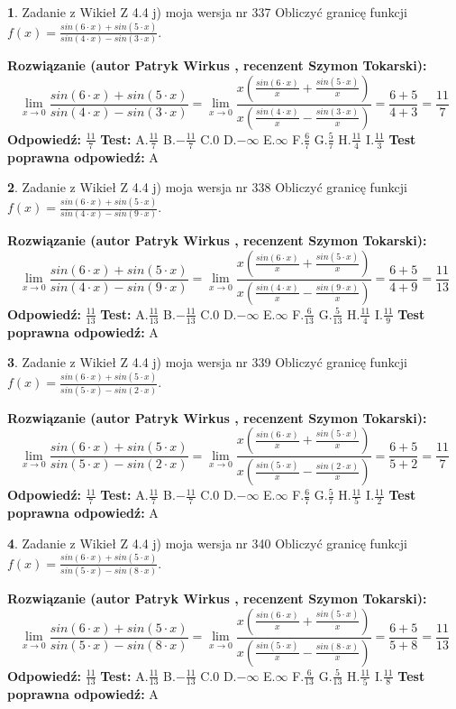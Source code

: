 \documentclass[12pt, a4paper]{article}
\theoremstyle{definition} %
\newtheorem{zad}{}
\newcommand{\zadStart}[1]{\begin{zad}#1\newline}
\newcommand{\zadStop}{\end{zad}}
\newcommand{\rozwStart}[2]{\noindent \textbf{Rozwiązanie (autor #1 , recenzent #2): }\newline}
\newcommand{\rozwStop}{\newline}
\newcommand{\odpStart}{\noindent \textbf{Odpowiedź:}\newline}
\newcommand{\odpStop}{\newline}
\newcommand{\testStart}{\noindent \textbf{Test:}\newline}
\newcommand{\testStop}{\newline}
\newcommand{\kluczStart}{\noindent \textbf{Test poprawna odpowiedź:}\newline}
\newcommand{\kluczStop}{\newline}
\begin{document}
\zadStart{Zadanie z Wikieł Z 4.4 j) moja wersja nr 337}
Obliczyć granicę funkcji $f(x)=\frac{sin(6\cdot x) +sin(5\cdot x)}{sin(4\cdot x) -sin(3\cdot x)}$.
\zadStop
\rozwStart{Patryk Wirkus}{Szymon Tokarski}
$$\lim\limits_{x\to 0}\frac{sin(6\cdot x) +sin(5\cdot x)}{sin(4\cdot x) -sin(3\cdot x)}=\lim\limits_{x\to 0}\frac{x(\frac{sin(6\cdot x)}{x}+\frac{sin(5\cdot x)}{x})}{x(\frac{sin(4\cdot x)}{x}-\frac{sin(3\cdot x)}{x})}=\frac{6+5}{4+3} = \frac{11}{7}$$
\rozwStop
\odpStart
$\frac{11}{7}$
\odpStop
\testStart
A.$\frac{11}{7}$
B.$-\frac{11}{7}$
C.$0$
D.$-\infty$
E.$\infty$
F.$\frac{6}{7}$
G.$\frac{5}{7}$
H.$\frac{11}{4}$
I.$\frac{11}{3}$
\testStop
\kluczStart
A
\kluczStop



\zadStart{Zadanie z Wikieł Z 4.4 j) moja wersja nr 338}
Obliczyć granicę funkcji $f(x)=\frac{sin(6\cdot x) +sin(5\cdot x)}{sin(4\cdot x) -sin(9\cdot x)}$.
\zadStop
\rozwStart{Patryk Wirkus}{Szymon Tokarski}
$$\lim\limits_{x\to 0}\frac{sin(6\cdot x) +sin(5\cdot x)}{sin(4\cdot x) -sin(9\cdot x)}=\lim\limits_{x\to 0}\frac{x(\frac{sin(6\cdot x)}{x}+\frac{sin(5\cdot x)}{x})}{x(\frac{sin(4\cdot x)}{x}-\frac{sin(9\cdot x)}{x})}=\frac{6+5}{4+9} = \frac{11}{13}$$
\rozwStop
\odpStart
$\frac{11}{13}$
\odpStop
\testStart
A.$\frac{11}{13}$
B.$-\frac{11}{13}$
C.$0$
D.$-\infty$
E.$\infty$
F.$\frac{6}{13}$
G.$\frac{5}{13}$
H.$\frac{11}{4}$
I.$\frac{11}{9}$
\testStop
\kluczStart
A
\kluczStop



\zadStart{Zadanie z Wikieł Z 4.4 j) moja wersja nr 339}
Obliczyć granicę funkcji $f(x)=\frac{sin(6\cdot x) +sin(5\cdot x)}{sin(5\cdot x) -sin(2\cdot x)}$.
\zadStop
\rozwStart{Patryk Wirkus}{Szymon Tokarski}
$$\lim\limits_{x\to 0}\frac{sin(6\cdot x) +sin(5\cdot x)}{sin(5\cdot x) -sin(2\cdot x)}=\lim\limits_{x\to 0}\frac{x(\frac{sin(6\cdot x)}{x}+\frac{sin(5\cdot x)}{x})}{x(\frac{sin(5\cdot x)}{x}-\frac{sin(2\cdot x)}{x})}=\frac{6+5}{5+2} = \frac{11}{7}$$
\rozwStop
\odpStart
$\frac{11}{7}$
\odpStop
\testStart
A.$\frac{11}{7}$
B.$-\frac{11}{7}$
C.$0$
D.$-\infty$
E.$\infty$
F.$\frac{6}{7}$
G.$\frac{5}{7}$
H.$\frac{11}{5}$
I.$\frac{11}{2}$
\testStop
\kluczStart
A
\kluczStop



\zadStart{Zadanie z Wikieł Z 4.4 j) moja wersja nr 340}
Obliczyć granicę funkcji $f(x)=\frac{sin(6\cdot x) +sin(5\cdot x)}{sin(5\cdot x) -sin(8\cdot x)}$.
\zadStop
\rozwStart{Patryk Wirkus}{Szymon Tokarski}
$$\lim\limits_{x\to 0}\frac{sin(6\cdot x) +sin(5\cdot x)}{sin(5\cdot x) -sin(8\cdot x)}=\lim\limits_{x\to 0}\frac{x(\frac{sin(6\cdot x)}{x}+\frac{sin(5\cdot x)}{x})}{x(\frac{sin(5\cdot x)}{x}-\frac{sin(8\cdot x)}{x})}=\frac{6+5}{5+8} = \frac{11}{13}$$
\rozwStop
\odpStart
$\frac{11}{13}$
\odpStop
\testStart
A.$\frac{11}{13}$
B.$-\frac{11}{13}$
C.$0$
D.$-\infty$
E.$\infty$
F.$\frac{6}{13}$
G.$\frac{5}{13}$
H.$\frac{11}{5}$
I.$\frac{11}{8}$
\testStop
\kluczStart
A
\kluczStop
\end{document}
